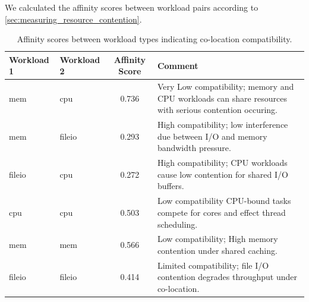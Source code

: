 We calculated the affinity scores between workload pairs according to \ref{sec:measuring_resource_contention}.

\begin{table}[H]
    \centering
    \caption{Affinity scores between workload types indicating co-location compatibility.}
    \label{tab:affinity_scores}
    \begin{tabularx}{\textwidth}{l l c X}
        \toprule
        \textbf{Workload 1} & \textbf{Workload 2} & \textbf{Affinity Score} & \textbf{Comment}                                                                                       \\
        \midrule
        mem                 & cpu                 & 0.736                   & Very Low compatibility; memory and CPU workloads can share resources with serious contention occuring. \\
        mem                 & fileio              & 0.293                   & High compatibility; low interference due between I/O and memory bandwidth pressure.                    \\
        fileio              & cpu                 & 0.272                   & High compatibility; CPU workloads cause low contention for shared I/O buffers.                         \\
        cpu                 & cpu                 & 0.503                   & Low compatibility CPU-bound tasks compete for cores and effect thread scheduling.                      \\
        mem                 & mem                 & 0.566                   & Low compatibility; High memory contention under shared caching.                                        \\
        fileio              & fileio              & 0.414                   & Limited compatibility; file I/O contention degrades throughput under co-location.                      \\
        \bottomrule
    \end{tabularx}
\end{table}

